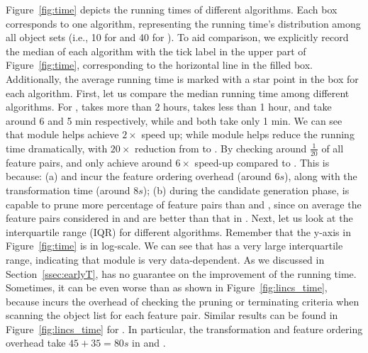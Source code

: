 Figure~\ref{fig:time} depicts the running times of different algorithms. Each box corresponds to one algorithm, representing the running time's distribution among all object sets (i.e., 10 for \msig and 40 for \lincs). 
To aid comparison, we explicitly record the median of each algorithm with the tick label in the upper part of Figure~\ref{fig:time}, corresponding to the horizontal line in the filled box. Additionally, the average running time is marked with a star point in the box for each algorithm. First, let us compare the median running time among different algorithms. For \msig, \baseline takes more than 2 hours, \earlyOrder takes less than 1 hour, \samp and \sampOpt take around 6 and 5 min respectively, while \horiz and \vertic both take only 1 min. We can see that \earlyT module helps achieve $2\times$ speed up; while \sampling module helps reduce the running time dramatically, with $20\times$ reduction from \baseline to \sampOpt. By checking around $\frac{1}{20}$ of all feature pairs, \horiz and \vertic only achieve around $6\times$ speed-up compared to \sampOpt. This is because: (a) \horiz and \vertic incur the feature ordering overhead (around $6s$), along with the transformation time (around $8s$); (b) during the candidate generation phase, \sampOpt is capable to prune more percentage of feature pairs than \horiz and \vertic, since on average the feature pairs considered in \horiz and \vertic are better than that in \sampOpt. Next, let us look at the interquartile range (IQR) for different algorithms. Remember that the y-axis in Figure~\ref{fig:time} is in log-scale. We can see that \earlyOrder has a very large interquartile range, indicating that \earlyT module is very data-dependent. As we discussed in Section~\ref{ssec:earlyT}, \earlyT has no guarantee on the improvement of the running time. Sometimes, it can be even worse than \baseline as shown in Figure~\ref{fig:lincs_time}, because \earlyT incurs the overhead of checking the pruning or terminating criteria when scanning the object list for each feature pair.
Similar results can be found in Figure~\ref{fig:lincs_time} for \lincs. In particular, the transformation and feature ordering overhead take $45+35=80s$ in \horiz and \vertic.



